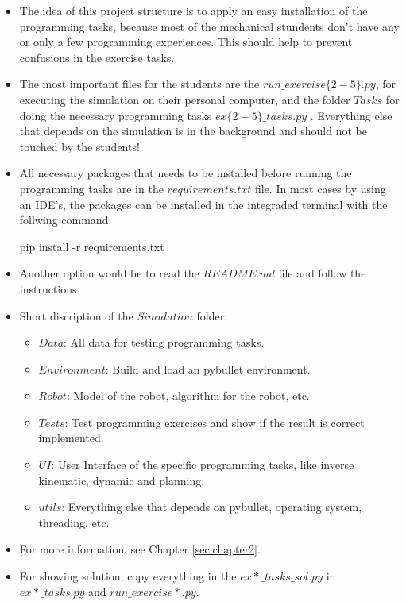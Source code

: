 \documentclass[
	ngerman,
	accentcolor=9c,%
	type=intern,
	marginpar=false
	]{tudapub}
\begin{document}
\begin{minipage}{0.69\textwidth}
\begin{itemize}
\item The idea of this project structure is to apply an easy installation of the programming tasks, because most of the mechanical stundents don't have any or only a few programming experiences. This should help  to prevent confusions in the exercise tasks. 

\item The most important files for the students are the $run\_exercise\{2-5\}.py$, for executing the simulation on their personal computer, and the folder $Tasks$ for doing the necessary programming tasks $ex\{2-5\}\_tasks.py$ . Everything else that depends on the simulation is in the background and should not be touched by the students! 

\item All necessary packages that needs to be installed before running the programming tasks are in the $requirements.txt$ file. In most cases by using an IDE's, the packages can be installed in the integraded terminal with the follwing command:
\begin{center}
pip install -r requirements.txt
\end{center}
\item Another option would be to read the $README.md$ file and follow the instructions
\item Short discription of the $Simulation$ folder:
\begin{itemize}
\item $Data$: All data for testing programming tasks. 
\item $Environment$: Build and load an pybullet environment. 
\item $Robot$: Model of the robot, algorithm for the robot, etc.
\item $Tests$: Test programming exercises and show if the result is correct implemented.
\item $UI$: User Interface of the specific programming tasks, like inverse kinematic, dynamic and planning.
\item $utils$: Everything else that depends on pybullet, operating system, threading, etc.
\end{itemize}

\item For more information, see Chapter \ref{sec:chapter2}.
\item For showing solution, copy everything in the $ex*\_tasks\_sol.py$ in $ex*\_tasks.py$ and $run\_exercise*.py$.
\end{itemize}
\end{minipage}
\end{document}
